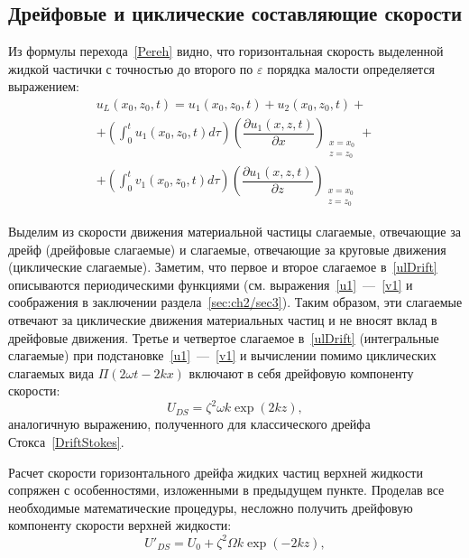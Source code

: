 \subsection{Дрейфовые и циклические составляющие скорости}

Из формулы перехода~\eqref{Pereh} видно, что горизонтальная скорость выделенной жидкой частички с точностью до второго по $ \varepsilon $ порядка малости определяется выражением:
\begin{multline}
u_{L}\left( x_{0}, z_{0}, t\right) = u_{1}\left( x_{0}, z_{0}, t\right)+u_{2}\left( x_{0}, z_{0}, t\right)+\\
+ \left( \int_{0}^{t}u_{1}\left( x_{0}, z_{0}, t\right)d \tau \right)\left( \dfrac{\partial u_{1}\left( x, z, t\right)}{\partial x}\right)_{\substack{x=x_{0}\\z=z_{0}}}+\\
+\left( \int_{0}^{t}v_{1}\left( x_{0}, z_{0}, t\right)d \tau \right)\left( \dfrac{\partial u_{1}\left( x, z, t\right)}{\partial z}\right)_{\substack{x=x_{0}\\z=z_{0}}}
\label{ulDrift}
\end{multline}

Выделим из скорости движения материальной частицы слагаемые, отвечающие за дрейф (дрейфовые слагаемые) и слагаемые, отвечающие за круговые движения (циклические слагаемые). Заметим, что первое и второе слагаемое в~\eqref{ulDrift} описываются периодическими функциями (см. выражения~\eqref{u1}~---~\eqref{v1} и соображения в заключении раздела~\ref{sec:ch2/sec3}). Таким образом, эти слагаемые отвечают за циклические движения материальных частиц и не вносят вклад в дрейфовые движения. Третье и четвертое слагаемое в~\eqref{ulDrift} (интегральные слагаемые) при подстановке~\eqref{u1}~---~\eqref{v1} и вычислении помимо циклических слагаемых вида $ \Pi \left( 2 \omega t - 2 k x \right) $ включают в себя дрейфовую компоненту скорости:
\begin{equation}
U_{DS}=\zeta^{2} \omega k \exp \left(2 k z\right),
\label{UdriftNizh}
\end{equation}
аналогичную выражению, полученного для классического дрейфа Стокса~\eqref{DriftStokes}.

Расчет скорости горизонтального дрейфа жидких частиц верхней жидкости сопряжен с особенностями, изложенными в предыдущем пункте. Проделав все необходимые математические процедуры, несложно получить дрейфовую компоненту скорости верхней жидкости:
\begin{equation}
U'_{DS}=U_{0}+\zeta^{2} \Omega k \exp \left(-2 k z\right),
\label{UdriftVerh}
\end{equation}

